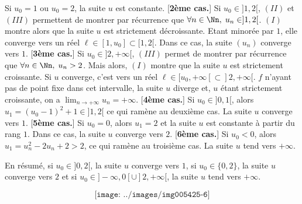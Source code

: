 {{\begin{itemize}
 Si $u_0=1$ ou $u_0=2$, la suite $u$ est constante.
[\textbf{2ème cas.}] Si $u_0\in]1,2[$, $(II)$ et $(III)$ permettent de montrer par récurrence que $\forall n\in\Nn,\;u_n\in]1,2[$. $(I)$ montre alors que la suite $u$ est strictement décroissante. Etant minorée par $1$, elle converge vers un réel $\ell\in[1,u_0]\subset[1,2[$. Dans ce cas, la suite $(u_n)$ converge vers $1$.
[\textbf{3ème cas.}] Si $u_0\in]2,+\infty[$, $(III)$ permet de montrer par récurrence que $\forall n\in\Nn,\;u_n>2$. Mais alors, $(I)$ montre que la suite $u$ est strictement croissante. Si $u$ converge, c'est vers un réel $\ell\in[u_0,+\infty[\subset]2,+\infty[$. $f$ n'ayant pas de point fixe dans cet intervalle, la suite $u$ diverge et, $u$ étant strictement croissante, on a $\lim_{n\rightarrow +\infty}u_n=+\infty$.
[\textbf{4ème cas.}] Si $u_0\in]0,1[$, alors $u_1=(u_0-1)^2+1\in]1,2[$ ce qui ramène au deuxième cas. La suite $u$ converge vers $1$.
[\textbf{5ème cas.}] Si $u_0=0$, alors $u_1=2$ et la suite $u$ est constante à partir du rang $1$. Dans ce cas, la suite $u$ converge vers $2$.
[\textbf{6ème cas.}] Si $u_0<0$, alors $u_1=u_n^2-2u_n+2>2$, ce qui ramène au troisième cas. La suite $u$ tend vers $+\infty$.
\end{itemize}

En résumé, si $u_0\in]0,2[$, la suite $u$ converge vers $1$, si $u_0\in\{0,2\}$, la suite $u$ converge vers $2$ et si $u_0\in]-\infty,0[\cup]2,+\infty[$, la suite $u$ tend vers $+\infty$.

$$\texttt{[image: ../images/img005425-6]}$$
}
}

